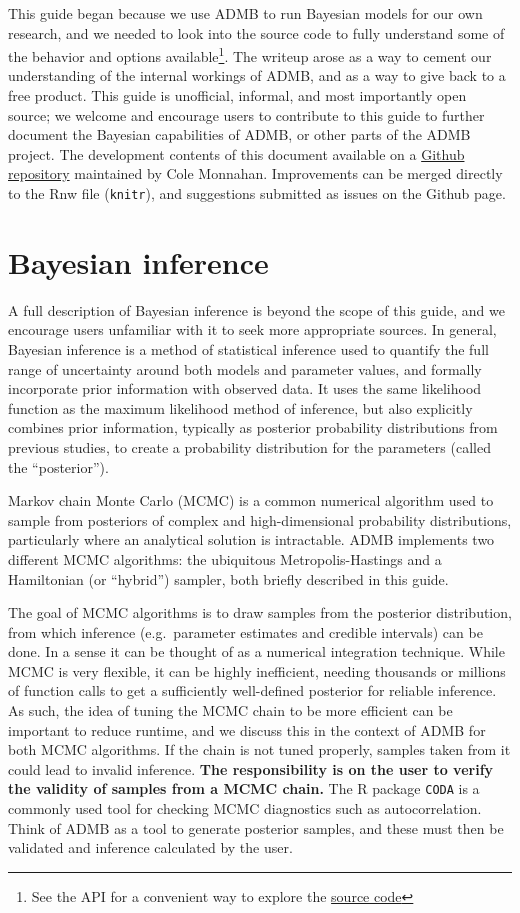 \documentclass{article}\usepackage[]{graphicx}\usepackage[]{color}
\begin{document}
This guide began because we use ADMB to run Bayesian models
for our own research, and we needed to look into the source
code to fully understand some of the behavior and options
available\footnote{See the API for a convenient way to
  explore the
  \href{http://admb-project.org/documentation/api/index.html}{source
  code}}. The writeup arose as a way to cement our
understanding of the internal workings of ADMB, and as a way
to give back to a free product.  This guide is unofficial,
informal, and most importantly open source; we welcome and
encourage users to contribute to this guide to further
document the Bayesian capabilities of ADMB, or other parts
of the ADMB project.  The development contents of this
document available on a
\href{https://github.com/colemonnahan/admb_guide}{Github
  repository} maintained by Cole Monnahan. Improvements can
be merged directly to the Rnw file (\texttt{knitr}), and
suggestions submitted as issues on the Github page.

\section{Bayesian inference}
A full description of Bayesian inference is beyond the scope
of this guide, and we encourage users unfamiliar with it to
seek more appropriate sources. In general, Bayesian
inference is a method of statistical inference used to
quantify the full range of uncertainty around both models
and parameter values, and formally incorporate prior
information with observed data. It uses the same likelihood
function as the maximum likelihood method of inference, but
also explicitly combines prior information, typically as
posterior probability distributions from previous studies,
to create a probability distribution for the parameters
(called the ``posterior'').

Markov chain Monte Carlo (MCMC) is a common numerical
algorithm used to sample from posteriors of complex and
high-dimensional probability distributions, particularly
where an analytical solution is intractable.  ADMB
implements two different MCMC algorithms: the ubiquitous
Metropolis-Hastings and a Hamiltonian (or ``hybrid'')
sampler, both briefly described in this guide.

The goal of MCMC algorithms is to draw samples from the
posterior distribution, from which inference (e.g.\
parameter estimates and credible intervals) can be done. In
a sense it can be thought of as a numerical integration
technique. While MCMC is very flexible, it can be highly
inefficient, needing thousands or millions of function calls
to get a sufficiently well-defined posterior for reliable
inference. As such, the idea of tuning the MCMC chain to be
more efficient can be important to reduce runtime, and we
discuss this in the context of ADMB for both MCMC
algorithms. If the chain is not tuned properly, samples
taken from it could lead to invalid inference. \textbf{The
  responsibility is on the user to verify the validity of
  samples from a MCMC chain.} The R package \texttt{CODA} is
a commonly used tool for checking MCMC diagnostics such as
autocorrelation. Think of ADMB as a tool to generate
posterior samples, and these must then be validated and
inference calculated by the user.
\end{document}
